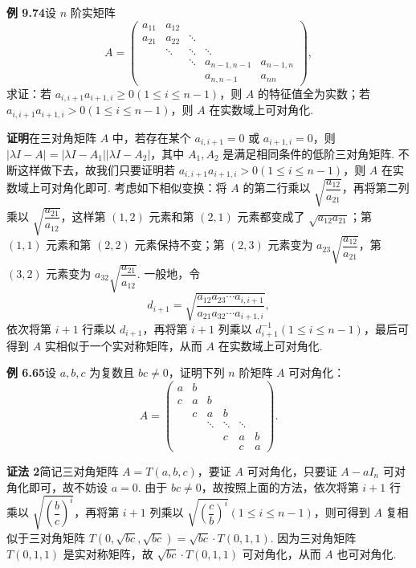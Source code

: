 \documentclass[UTF8, 12pt, fontset=fandol, oneside]{ctexart}
\begin{document}
\noindent\textbf{例 9.74}\quad 设 $n$ 阶实矩阵
\[
A=\begin{pmatrix}
a_{11}&a_{12}&&&\\
a_{21}&a_{22}&\ddots&&\\
&\ddots&\ddots&\ddots&\\
&&\ddots&a_{n-1,n-1}&a_{n-1,n}\\
&&&a_{n,n-1}&a_{nn}
\end{pmatrix},
\]
求证：若 $a_{i,i+1}a_{i+1,i}\ge0(1\le i\le n-1)$，则 $A$ 的特征值全为实数；若 $a_{i,i+1}a_{i+1,i}>0(1\le i\le n-1)$，则 $A$ 在实数域上可对角化.

\noindent\textbf{证明}\quad 在三对角矩阵 $A$ 中，若存在某个 $a_{i,i+1}=0$ 或 $a_{i+1,i}=0$，则 $|\lambda I-A|=|\lambda I-A_1||\lambda I-A_2|$，其中 $A_1,A_2$ 是满足相同条件的低阶三对角矩阵. 不断这样做下去，故我们只要证明若 $a_{i,i+1}a_{i+1,i}>0(1\le i\le n-1)$，则 $A$ 在实数域上可对角化即可. 考虑如下相似变换：将 $A$ 的第二行乘以 $\sqrt{\dfrac{a_{12}}{a_{21}}}$，再将第二列乘以 $\sqrt{\dfrac{a_{21}}{a_{12}}}$，这样第 $(1,2)$ 元素和第 $(2,1)$ 元素都变成了 $\sqrt{a_{12}a_{21}}$；第 $(1,1)$ 元素和第 $(2,2)$ 元素保持不变；第 $(2,3)$ 元素变为 $a_{23}\sqrt{\dfrac{a_{12}}{a_{21}}}$，第 $(3,2)$ 元素变为 $a_{32}\sqrt{\dfrac{a_{21}}{a_{12}}}$. 一般地，令
\[
d_{i+1}=\sqrt{\frac{a_{12}a_{23}\cdots a_{i,i+1}}{a_{21}a_{32}\cdots a_{i+1,i}}},
\]
依次将第 $i+1$ 行乘以 $d_{i+1}$，再将第 $i+1$ 列乘以 $d_{i+1}^{-1}(1\le i\le n-1)$，最后可得到 $A$ 实相似于一个实对称矩阵，从而 $A$ 在实数域上可对角化.

\noindent\textbf{例 6.65}\quad 设 $a,b,c$ 为复数且 $bc\ne0$，证明下列 $n$ 阶矩阵 $A$ 可对角化：
\[
A=\begin{pmatrix}
a&b&&&\\
c&a&b&&\\
&c&a&b&\\
&&\ddots&\ddots&\ddots\\
&&&c&a&b\\
&&&&c&a
\end{pmatrix}.
\]

\noindent\textbf{证法 2}\quad 简记三对角矩阵 $A=T(a,b,c)$，要证 $A$ 可对角化，只要证 $A-aI_n$ 可对角化即可，故不妨设 $a=0$. 由于 $bc\ne0$，故按照上面的方法，依次将第 $i+1$ 行乘以 $\sqrt{\left(\dfrac bc\right)^i}$，再将第 $i+1$ 列乘以 $\sqrt{\left(\dfrac cb\right)^i}(1\le i\le n-1)$，则可得到 $A$ 复相似于三对角矩阵 $T(0,\sqrt{bc},\sqrt{bc})=\sqrt{bc}\cdot T(0,1,1)$. 因为三对角矩阵 $T(0,1,1)$ 是实对称矩阵，故 $\sqrt{bc}\cdot T(0,1,1)$ 可对角化，从而 $A$ 也可对角化.
\end{document}
